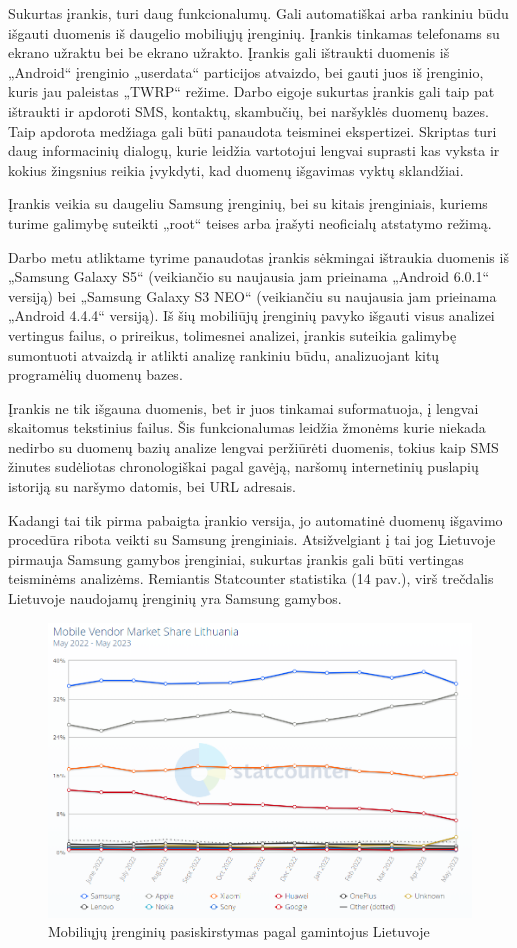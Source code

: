 
Sukurtas įrankis, turi daug funkcionalumų. Gali automatiškai arba rankiniu būdu išgauti duomenis iš daugelio mobiliųjų įrenginių.  Įrankis tinkamas telefonams su ekrano užraktu bei be ekrano užrakto. Įrankis gali ištraukti duomenis iš „Android“ įrenginio „userdata“ particijos atvaizdo, bei gauti juos iš įrenginio, kuris jau paleistas „TWRP“ režime.  Darbo eigoje sukurtas įrankis gali taip pat ištraukti ir apdoroti SMS, kontaktų, skambučių, bei naršyklės duomenų bazes. Taip apdorota medžiaga gali būti panaudota teisminei ekspertizei. Skriptas turi daug informacinių dialogų, kurie leidžia vartotojui lengvai suprasti kas vyksta ir kokius žingsnius reikia įvykdyti, kad duomenų išgavimas vyktų sklandžiai.

Įrankis veikia su daugeliu Samsung įrenginių, bei su kitais įrenginiais, kuriems turime galimybę suteikti „root“ teises arba įrašyti neoficialų atstatymo režimą. 

Darbo metu atliktame tyrime panaudotas įrankis sėkmingai ištraukia duomenis iš „Samsung Galaxy S5“ (veikiančio su naujausia jam prieinama „Android 6.0.1“ versiją) bei  „Samsung Galaxy S3 NEO“ (veikiančiu su naujausia jam prieinama „Android 4.4.4“ versiją). Iš šių mobiliūjų įrenginių pavyko išgauti visus analizei vertingus failus, o prireikus, tolimesnei analizei, įrankis suteikia galimybę sumontuoti atvaizdą ir atlikti analizę rankiniu būdu, analizuojant kitų programėlių duomenų bazes. 

Įrankis ne tik išgauna duomenis, bet ir juos tinkamai suformatuoja, į lengvai skaitomus tekstinius failus. Šis funkcionalumas leidžia žmonėms kurie niekada nedirbo su duomenų bazių analize lengvai peržiūrėti duomenis, tokius kaip SMS žinutes sudėliotas chronologiškai pagal gavėją, naršomų internetinių puslapių istoriją su naršymo datomis, bei URL adresais. 

Kadangi tai tik pirma pabaigta įrankio versija, jo automatinė duomenų išgavimo procedūra ribota veikti su Samsung įrenginiais. Atsižvelgiant į tai jog Lietuvoje pirmauja Samsung gamybos įrenginiai, sukurtas įrankis gali būti vertingas teisminėms analizėms. Remiantis Statcounter statistika \cite{StatcounterLithuania} (14 pav.),  virš trečdalis Lietuvoje naudojamų įrenginių yra Samsung gamybos.
\begin{figure} [h]
    \centering
    \includegraphics[width=0.85\linewidth]{stat_lt2.png}
    \caption{Mobiliųjų įrenginių pasiskirstymas pagal gamintojus Lietuvoje}
    \label{fig:LT_tel_statistics}
\end{figure}